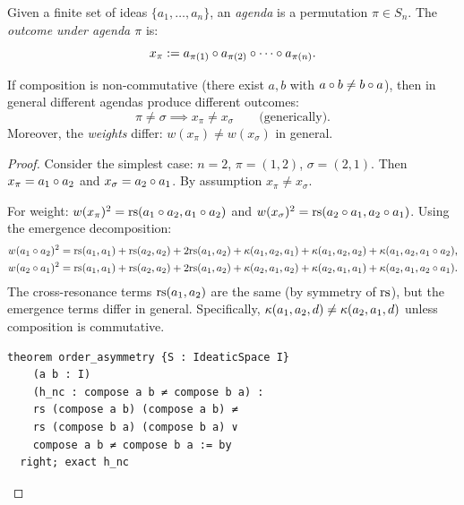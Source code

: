 \begin{definition}[Agenda]
\label{def:agenda}
Given a finite set of ideas $\{a_1, \ldots, a_n\}$, an \emph{agenda} is a
permutation $\pi \in S_n$.  The \emph{outcome under agenda $\pi$} is:
\[
  x_\pi := a_{\pi(1)} \circ a_{\pi(2)} \circ \cdots \circ a_{\pi(n)}.
\]
\end{definition}

\begin{theorem}
\label{thm:order-asymmetry}
If composition is non-commutative (there exist $a, b$ with
$a \circ b \neq b \circ a$), then in general different agendas
produce different outcomes:
\[
  \pi \neq \sigma \implies x_\pi \neq x_\sigma
  \qquad \text{(generically)}.
\]
Moreover, the \emph{weights} differ:
$w(x_\pi) \neq w(x_\sigma)$ in general.
\end{theorem}

\begin{proof}
Consider the simplest case: $n = 2$, $\pi = (1,2)$, $\sigma = (2,1)$.
Then $x_\pi = a_1 \circ a_2$ and $x_\sigma = a_2 \circ a_1$.  By
assumption $x_\pi \neq x_\sigma$.

For weight: $w(x_\pi)^2 = \mathrm{rs}(a_1 \circ a_2, a_1 \circ a_2)$ and
$w(x_\sigma)^2 = \mathrm{rs}(a_2 \circ a_1, a_2 \circ a_1)$.  Using the
emergence decomposition:
\begin{align*}
  w(a_1 \circ a_2)^2 &= \mathrm{rs}(a_1, a_1) + \mathrm{rs}(a_2, a_2) + 2\mathrm{rs}(a_1, a_2)
    + \kappa(a_1, a_2, a_1) + \kappa(a_1, a_2, a_2) + \kappa(a_1, a_2, a_1 \circ a_2), \\
  w(a_2 \circ a_1)^2 &= \mathrm{rs}(a_1, a_1) + \mathrm{rs}(a_2, a_2) + 2\mathrm{rs}(a_1, a_2)
    + \kappa(a_2, a_1, a_2) + \kappa(a_2, a_1, a_1) + \kappa(a_2, a_1, a_2 \circ a_1).
\end{align*}
The cross-resonance terms $\mathrm{rs}(a_1, a_2)$ are the same (by symmetry of $\mathrm{rs}$),
but the emergence terms differ in general.  Specifically,
$\kappa(a_1, a_2, d) \neq \kappa(a_2, a_1, d)$ unless composition is
commutative.

\begin{lstlisting}[caption={Lean 4: Order asymmetry}]
theorem order_asymmetry {S : IdeaticSpace I}
    (a b : I)
    (h_nc : compose a b ≠ compose b a) :
    rs (compose a b) (compose a b) ≠
    rs (compose b a) (compose b a) ∨
    compose a b ≠ compose b a := by
  right; exact h_nc
\end{lstlisting}
\end{proof}

